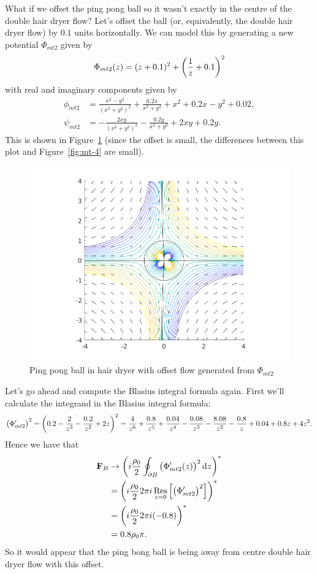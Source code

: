 \documentclass{article}
\DeclareMathOperator*{\res}{Res}
\def\*#1{\mathbf{#1}}
\begin{document}
What if we offset the ping pong ball so it wasn't exactly in the centre
of the double hair dryer flow? Let's offset the ball (or, equivalently, the
double hair dryer flow) by $0.1$ units horizontally. We can model this by
generating a new potential $\Phi_{mt2}$ given by
%
\begin{equation*}
    \Phi_{mt2}(z) = (z + 0.1)^2 + \del{\frac{1}{z} + 0.1}^2
\end{equation*}
%
with real and imaginary components given by
%
\begin{align*}
    \phi_{mt2} &= \frac{x^2 - y^2}{(x^2 + y^2)^2} + \frac{0.2 x}{x^2 + y^2} + x^2 + 0.2x - y^2 + 0.02, \\
    \psi_{mt2} &= - \frac{2 x y}{(x^2 + y^2)^2} - \frac{0.2 y}{x^2 + y^2} + 2 x y + 0.2 y
    .
\end{align*}
%
This is shown in Figure~\ref{fig:mt-5} (since the offset is small,
the differences between this plot and Figure~\ref{fig:mt-4} are
small).
%
\begin{figure}[ht]
    \includegraphics[width=35em]{mt_ex2_3}
    \centering
    \caption{Ping pong ball in hair dryer with offset flow generated from $\Phi_{mt2}$}
    \label{fig:mt-5}
\end{figure}
%
Let's go ahead and compute the Blasius integral formula again. First
we'll calculate the integrand in the Blasius integral formula:
%
\begin{equation*}
    \del{\Phi^\prime_{mt2}}^2
        = \del{0.2 - \frac{2}{z^3} - \frac{0.2}{z^2} + 2 z}^2
        = \frac{4}{z^6} + \frac{0.8}{z^5} + \frac{0.04}{z^4} - \frac{0.08}{z^3} - \frac{8.08}{z^2} - \frac{0.8}{z} + 0.04 + 0.8 z + 4 z^2
        .
\end{equation*}
%
Hence we have that
%
\begin{align*}
    \*F_B
        &\to \del{i \frac{\rho_0}{2} \oint_{\partial B} \del{\Phi_{mt2}^\prime(z)}^2 \dif z}^* \\
        &= \del{i \frac{\rho_0}{2} 2 \pi i \res_{z = 0} \sbr{\del{\Phi^\prime_{mt2}}^2}}^* \\
        &= \del{i \frac{\rho_0}{2} 2 \pi i (-0.8)}^* \\
        &= 0.8 \rho_0 \pi
    .
\end{align*}
%
So it would appear that the ping bong ball is being away from
centre double hair dryer flow with this offset.
\end{document}
